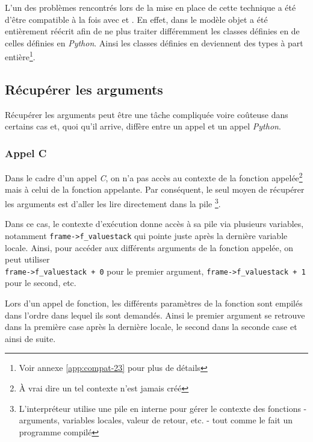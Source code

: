 \begin{note}
L'un des problèmes rencontrés lors de la mise en place de cette technique a été d'être compatible à la fois avec  et . En effet, dans  le modèle objet a été entièrement réécrit afin de ne plus traiter différemment les classes définies en \C de celles définies en \emph{Python}. Ainsi les classes définies en \Python deviennent des types à part entière\footnote{Voir annexe \vref{app:compat-23} pour plus de détails}.
\end{note}

\subsection{Récupérer les arguments}
Récupérer les arguments peut être une tâche compliquée voire coûteuse dans certains cas et, quoi qu'il arrive, diffère entre un appel \C et un appel \emph{Python}.

\subsubsection*{Appel C}
Dans le cadre d'un appel \emph{C}, on n'a pas accès au contexte de la fonction appelée\footnote{À vrai dire un tel contexte n'est jamais créé} mais à celui de la fonction appelante. Par conséquent, le seul moyen de récupérer les arguments est d'aller les lire directement dans la pile \Python\footnote{L'interpréteur \Python utilise une pile en interne pour gérer le contexte des fonctions - arguments, variables locales, valeur de retour, etc. - tout comme le fait un programme \C compilé}.

Dans ce cas, le contexte d'exécution donne accès à sa pile via plusieurs variables, notamment \verb|frame->f_valuestack| qui pointe juste après la dernière variable locale. Ainsi, pour accéder aux différents arguments de la fonction \C appelée, on peut utiliser\\ \verb|frame->f_valuestack + 0| pour le premier argument, \verb|frame->f_valuestack + 1| pour le second, etc.

\begin{note}
Lors d'un appel de fonction, les différents paramètres de la fonction sont empilés dans l'ordre dans lequel ils sont demandés. Ainsi le premier argument se retrouve dans la première case après la dernière locale, le second dans la seconde case et ainsi de suite.
\end{note}

